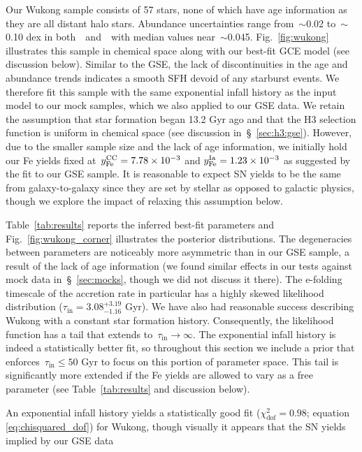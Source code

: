 \documentclass[ms.tex]{subfiles}
\begin{document}
Our Wukong sample consists of 57 stars, none of which have age information as
they are all distant halo stars.
Abundance uncertainties range from~$\sim$0.02 to~$\sim$0.10 dex in
both~\afe~and~\feh~with median values near~$\sim$0.045.
Fig.~\ref{fig:wukong} illustrates this sample in chemical space along with our
best-fit GCE model (see discussion below).
Similar to the GSE, the lack of discontinuities in the age and abundance trends
indicates a smooth SFH devoid of any starburst events.
We therefore fit this sample with the same exponential infall history as the
input model to our mock samples, which we also applied to our GSE data.
We retain the assumption that star formation began 13.2 Gyr ago and that the H3
selection function is uniform in chemical space (see discussion
in~\S~\ref{sec:h3:gse}).
However, due to the smaller sample size and the lack of age information, we
initially hold our Fe yields fixed at~$y_\text{Fe}^\text{CC} = 7.78\times10^{-3}$ and
$y_\text{Fe}^\text{Ia} = 1.23\times10^{-3}$ as suggested by the fit to our GSE sample.
It is reasonable to expect SN yields to be the same from galaxy-to-galaxy since
they are set by stellar as opposed to galactic physics, though we explore the
impact of relaxing this assumption below.
\par
Table~\ref{tab:results} reports the inferred best-fit parameters and
Fig.~\ref{fig:wukong_corner} illustrates the posterior distributions.
The degeneracies between parameters are noticeably more asymmetric than in our
GSE sample, a result of the lack of age information (we found similar effects
in our tests against mock data in~\S~\ref{sec:mocks}, though we did not discuss
it there).
The e-folding timescale of the accretion rate in particular has a highly skewed
likelihood distribution ($\tau_\text{in} = 3.08^{+3.19}_{-1.16}$ Gyr).
We have also had reasonable success describing Wukong with a constant star
formation history.
Consequently, the likelihood function has a tail that extends
to~$\tau_\text{in} \rightarrow \infty$.
The exponential infall history is indeed a statistically better fit, so
throughout this section we include a prior that
enforces~$\tau_\text{in} \leq 50$ Gyr to focus on this portion of parameter
space.
This tail is significantly more extended if the Fe yields are allowed to vary
as a free parameter (see Table~\ref{tab:results} and discussion below).
\par
An exponential infall history yields a statistically good fit
($\chi_\text{dof}^2 = 0.98$; equation \ref{eq:chisquared_dof}) for Wukong,
though visually it appears that the SN yields implied by our GSE data
\end{document}
